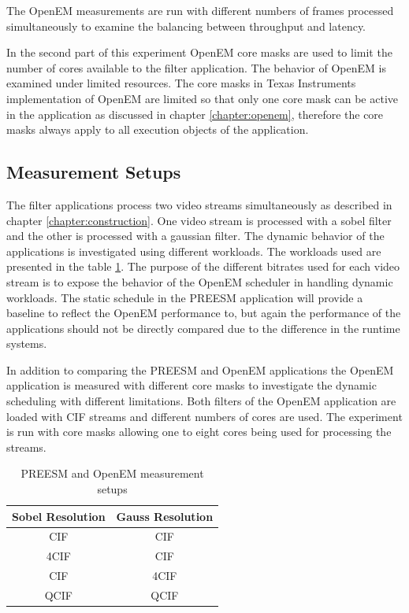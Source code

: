 The OpenEM measurements are run with different numbers of frames processed
simultaneously to examine the balancing between throughput and latency.

In the second part of this experiment OpenEM core masks are used to limit the
number of cores available to the filter application. The behavior of OpenEM is
examined under limited resources. The core masks in Texas Instruments
implementation of OpenEM are limited so that only one core mask can be active in
the application as discussed in chapter \ref{chapter:openem}, therefore the core
masks always apply to all execution objects of the application.

\subsection{Measurement Setups}
The filter applications process two video streams simultaneously as described in
chapter \ref{chapter:construction}. One video stream is processed with a sobel
filter and the other is processed with a gaussian filter. The dynamic behavior
of the applications is investigated using different workloads. The workloads
used are presented in the table \ref{tab:preesm_setups}. The purpose of the
different bitrates used for each video stream is to expose the behavior of the
OpenEM scheduler in handling dynamic workloads. The static schedule in the
PREESM application will provide a baseline to reflect the OpenEM performance to,
but again the performance of the applications should not be directly compared
due to the difference in the runtime systems.

In addition to comparing the PREESM and OpenEM applications the OpenEM
application is measured with different core masks to investigate the dynamic
scheduling with different limitations. Both filters of the OpenEM application
are loaded with CIF streams and different numbers of cores are used. The
experiment is run with core masks allowing one to eight cores being used for
processing the streams.

\begin{table}
    \begin{center}
        \begin{tabular}{ c c }
            Sobel Resolution & Gauss Resolution \\ \hline
            CIF              & CIF              \\ \hline
            4CIF             & CIF              \\ \hline
            CIF              & 4CIF             \\ \hline
            QCIF             & QCIF             \\ \hline
        \end{tabular}
        \caption{PREESM and OpenEM measurement setups}
        \label{tab:preesm_setups}
    \end{center}
\end{table}

